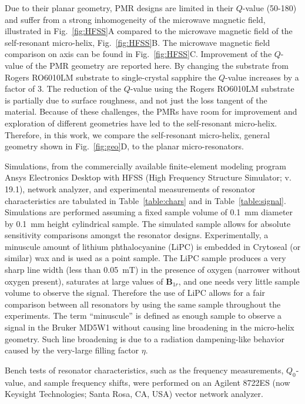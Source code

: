 Due to their planar geometry, PMR designs are limited in their $Q$-value (50-180) and suffer from a strong inhomogeneity of the microwave magnetic field, illustrated in Fig.~\ref{fig:HFSS}A compared to the microwave magnetic field of the self-resonant micro-helix, Fig.~\ref{fig:HFSS}B. The microwave magnetic field comparison on axis can be found in Fig.~\ref{fig:HFSS}C. Improvement of the $Q$-value of the PMR geometry are reported here. By changing the substrate from Rogers RO6010LM substrate to single-crystal sapphire the $Q$-value increases by a factor of 3. The reduction of the $Q$-value using the Rogers RO6010LM substrate is partially due to surface roughness, and not just the loss tangent of the material. Because of these challenges, the PMRs have room for improvement and exploration of different geometries have led to the self-resonant micro-helix. Therefore, in this work, we compare the self-resonant micro-helix, general geometry shown in Fig.~\ref{fig:geo}D, to the planar micro-resonators.

Simulations, from the commercially available finite-element modeling program Ansys Electronics Desktop with HFSS (High Frequency Structure Simulator; v. 19.1), network analyzer, and experimental measurements of resonator characteristics are tabulated in Table~\ref{table:chars} and in Table~\ref{table:signal}. Simulations are performed assuming a fixed sample volume of 0.1~mm diameter by 0.1~mm height cylindrical sample. The simulated sample allows for absolute sensitivity comparisons amongst the resonator designs. Experimentally, a minuscule amount of lithium phthalocyanine (LiPC)\cite{Liu5438} is embedded in Crytoseal (or similar) wax and is used as a point sample. The LiPC sample produces a very sharp line width (less than 0.05~mT) in the presence of oxygen (narrower without oxygen present), saturates at large values of ${\mathbf B}_{1r}$, and one needs very little sample volume to observe the signal. Therefore the use of LiPC allows for a fair comparison between all resonators by using the same sample throughout the experiments. The term ``minuscule'' is defined as enough sample to observe a signal in the Bruker MD5W1 without causing line broadening in the micro-helix geometry. Such line broadening is due to a radiation dampening-like behavior caused by the very-large filling factor $\eta$.

Bench tests of resonator characteristics, such as the frequency measurements, $Q_0$-value, and sample frequency shifts, were performed on an Agilent 8722ES (now Keysight Technologies; Santa Rosa, CA, USA) vector network analyzer.

